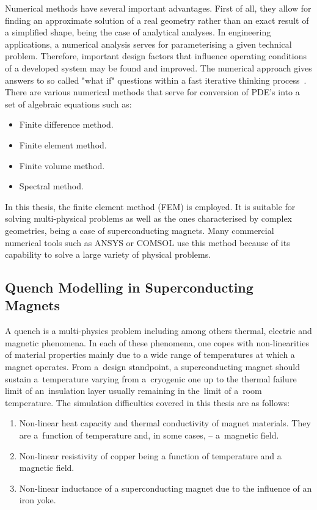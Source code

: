 Numerical methods have several important advantages. First of all, they allow for finding an approximate solution of a real geometry rather than an exact result of a simplified shape, being the case of analytical analyses. In engineering applications, a numerical analysis serves for parameterising a given technical problem. Therefore, important design factors that influence operating conditions of a developed system may be found and improved. The numerical approach gives answers to so called "what if" questions within a fast iterative thinking process~\cite{heat_transfer_practical_approach_cengel}. There are various numerical methods that serve for conversion of PDE's into a set of algebraic equations such as: 
\begin{itemize}
    \item Finite difference method.
    \item Finite element method.
    \item Finite volume method.
    \item Spectral method.
\end{itemize}

In this thesis, the finite element method (FEM) is employed. It is suitable for solving multi-physical problems as well as the ones characterised by complex geometries, being a case of superconducting magnets. Many commercial numerical tools such as ANSYS or COMSOL use this method because of its capability to solve a large variety of physical problems. 

\subsection{Quench Modelling in Superconducting Magnets}

A quench is a multi-physics problem including among others thermal, electric and magnetic phenomena. In each of these phenomena, one copes with non-linearities of material properties mainly due to a wide range of temperatures at which a magnet operates. From a~design standpoint, a superconducting magnet should sustain a~temperature varying from a~cryogenic one up to the thermal failure limit of an~insulation layer usually remaining in the~limit of a~room temperature. The simulation difficulties covered in this thesis are as follows: 

\begin{enumerate}
    \item Non-linear heat capacity and thermal conductivity of magnet materials. They are a~function of temperature and, in some cases, -- a~magnetic field. 
    \item Non-linear resistivity of copper being a function of temperature and a magnetic field.
    \item Non-linear inductance of a superconducting magnet due to the influence of an iron yoke. 
\end{enumerate}

